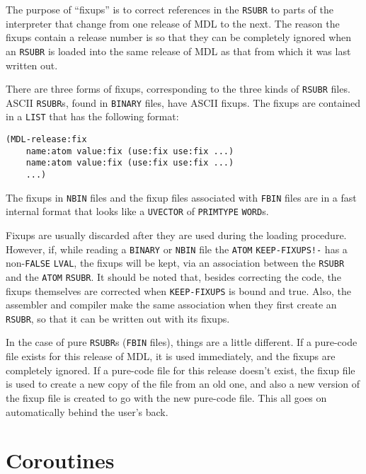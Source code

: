 \documentclass[a4paper]{scrbook}
\begin{document}
The purpose of ``fixups'' is to correct references in the \texttt{RSUBR} to parts of the interpreter that change from one
release of MDL to the next. The reason the fixups contain a release number is so that they can be completely ignored when
an \texttt{RSUBR} is loaded into the same release of MDL as that from which it was last written out.

There are three forms of fixups, corresponding to the three kinds of \texttt{RSUBR} files. ASCII \texttt{RSUBR}s, found in
\texttt{BINARY} files, have ASCII fixups. The fixups are contained in a \texttt{LIST} that has the following format:

\begin{verbatim}
(MDL-release:fix
    name:atom value:fix (use:fix use:fix ...)
    name:atom value:fix (use:fix use:fix ...)
    ...)
\end{verbatim}

The fixups in \texttt{NBIN} files and the fixup files associated with \texttt{FBIN} files are in a fast internal format
that looks like a \texttt{UVECTOR} of \texttt{PRIMTYPE} \texttt{WORD}s.

Fixups are usually discarded after they are used during the loading procedure. However, if, while reading a \texttt{BINARY}
or \texttt{NBIN} file the \texttt{ATOM} \texttt{KEEP-FIXUPS!-} has a non-\texttt{FALSE}
\texttt{LVAL}, the fixups will be kept, via an association between the \texttt{RSUBR} and the \texttt{ATOM} \texttt{RSUBR}.
It should be noted that, besides correcting the code, the fixups themselves are corrected when \texttt{KEEP-FIXUPS} is
bound and true. Also, the assembler and compiler make the same association when they first create an \texttt{RSUBR}, so
that it can be written out with its fixups.

In the case of pure \texttt{RSUBR}s (\texttt{FBIN} files), things are a little different. If a pure-code file exists for
this release of MDL, it is used immediately, and the fixups are completely ignored. If a pure-code file for this release
doesn't exist, the fixup file is used to create a new copy of the file from an old one, and also a new version of the fixup
file is created to go with the new pure-code file. This all goes on automatically behind the user's back.

\chapter{Coroutines}\label{chapter-20.-coroutines}
\end{document}
